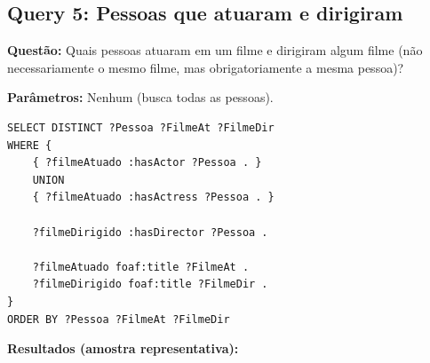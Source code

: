 \documentclass[12pt,a4paper]{article}
\begin{document}
\subsection{Query 5: Pessoas que atuaram e dirigiram}

\textbf{Questão:} Quais pessoas atuaram em um filme e dirigiram algum filme (não necessariamente o mesmo filme, mas obrigatoriamente a mesma pessoa)?

\textbf{Parâmetros:} Nenhum (busca todas as pessoas).

\begin{lstlisting}
SELECT DISTINCT ?Pessoa ?FilmeAt ?FilmeDir
WHERE {
    { ?filmeAtuado :hasActor ?Pessoa . }
    UNION
    { ?filmeAtuado :hasActress ?Pessoa . }
    
    ?filmeDirigido :hasDirector ?Pessoa .
    
    ?filmeAtuado foaf:title ?FilmeAt .
    ?filmeDirigido foaf:title ?FilmeDir .
}
ORDER BY ?Pessoa ?FilmeAt ?FilmeDir
\end{lstlisting}

\textbf{Resultados (amostra representativa):}
\end{document}
